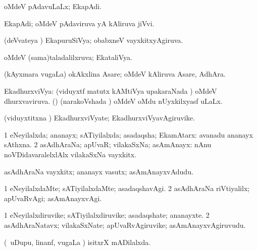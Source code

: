 \bentry
{} 
\gl{\gu}
\expl{}
\bmng
oMdeV pAdavuLaLx; EkapAdi. 
\emng
\eentry

\bentry
{} 
\gl{\nA}
\expl{}
\bmng
EkapAdi; oMdeV pAdaviruva yA kAliruva jiVvi. 
\emng
\eentry

\bentry
{} 
\gl{\gu}
\expl{}
\bmng
(deVvateya \vi) EkapuruSiVya; obabxneV vayxkitxyAgiruva. 
\emng
\eentry

\bentry
{} 
\gl{\gu}
\expl{}
\bmng
oMdeV (sama)taladalilxruva; EkataliVya. 
\emng
\eentry

\bentry
{} 
\gl{\nA}
\expl{}
\bmng
(kAyxmara \mo vugaLa) okAkxlina Asare; oMdeV kAliruva Asare, AdhAra. 
\emng
\eentry

\bentry
{} 
\gl{\gu}
\expl{}
\bmng
EkadhurxviVya: 
\banum
{} (viduyxtf matutx kAMtiVya upakaraNada \vi) oMdeV dhurxvaviruva. 
 (\jiVvi) (narakoVshada \vi) oMdeV oMdu nUyxkilxyasf uLaLx. 
\eanum
\emng
\eentry

\bentry
{} 
\gl{\nA}
\expl{}
\bmng
(viduyxtitxna \vi) EkadhurxviVyate; EkadhurxviVyavAgiruvike. 
\emng
\eentry

\bentry
{} 
\gl{\gu}
\expl{}
\bmng
\bnum
\num{1} eNeyilalxda; ananayx; sATiyilalxda; asadaqsha; EkamAtarx:  avanadu ananayx sAthxna. 
\num{2} asAdhAraNa; apUvaR; vilakaSxNa; asAmAnayx:  nAnu noVDidavaralelxlAlx vilakaSxNa vayxkitx. 
\enum
\emng
\eentry

\bentry
{} 
\gl{\nA}
\expl{}
\bmng
asAdhAraNa vayxkitx; ananayx vasutx; asAmAnayxvAdudu. 
\emng
\eentry

\bentry
{} 
\gl{\kirxvi}
\expl{}
\bmng
\bnum
\num{1} eNeyilalxdaMte; sATiyilalxdaMte; asadaqshavAgi. 
\num{2} asAdhAraNa riVtiyalilx; apUvaRvAgi; asAmAnayxvAgi. 
\enum
\emng
\eentry

\bentry
{} 
\gl{\nA}
\expl{}
\bmng
\bnum
\num{1} eNeyilalxdiruvike; sATiyilalxdiruvike; asadaqshate; ananayxte. 
\num{2} asAdhAraNatavx; vilakaSxNate; apUvaRvAgiruvike; asAmAnayxvAgiruvudu. 
\enum
\emng
\eentry

\bentry
{} 
\gl{\gu}
\expl{}
\bmng
(\kanmu\ uDupu, linanf, \mo vugaLa \vi) isitxrX mADilalxda. 
\emng
\eentry

